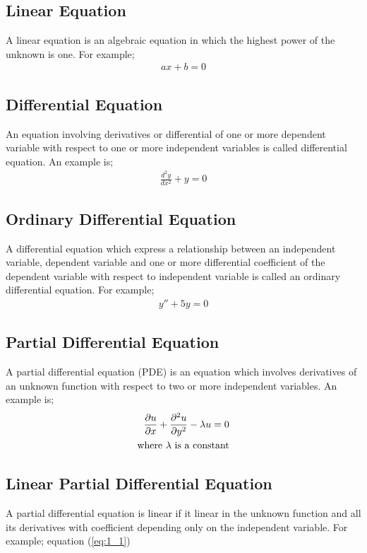 \documentclass[11pt]{report}
\newcommand{\refn}[1]{(\ref{#1})}
\newcommand{\refx}[1]{\refn{eq:#1}}
\newcommand{\dprime}{''}
\begin{document}
	\subsection{Linear Equation}
	A linear equation is an algebraic equation in which the highest power of the unknown is one. For example;
	\begin{eqnarray}
		ax+b=0\label{eq:3_3}
	\end{eqnarray}
	
	\subsection{Differential Equation}
	An equation involving derivatives or differential of one or more dependent variable with respect to one or more independent variables is called differential equation. An example is;
	\begin{eqnarray}
		\frac{d^2y}{dx^2} + y = 0\label{eq:3_4}
	\end{eqnarray}
	
	\subsection{Ordinary Differential Equation}
	A differential equation which express a relationship between an independent variable, dependent variable and one or more differential coefficient of the dependent variable with respect to independent variable is called an ordinary differential equation. For example;
	\begin{eqnarray}
		y\dprime + 5y = 0 \label{eq:3_5}
	\end{eqnarray}
	
	\subsection{Partial Differential Equation}
	A partial differential equation (PDE) is an equation which involves derivatives of an unknown function with respect to two or more independent variables. An example is;
	\begin{eqnarray}
		\frac{\partial u}{\partial x} + \frac{\partial^2u}{\partial y^2} - \lambda u = 0\label{eq:3_6}\\
		\text{where }\lambda \text{ is a constant}\notag
	\end{eqnarray}
	
	\subsection{Linear Partial Differential Equation}
	A partial differential equation is linear if it linear in the unknown function and all its derivatives with coefficient depending only on the independent variable. For example; equation \refx{1_1}
	
\end{document}
